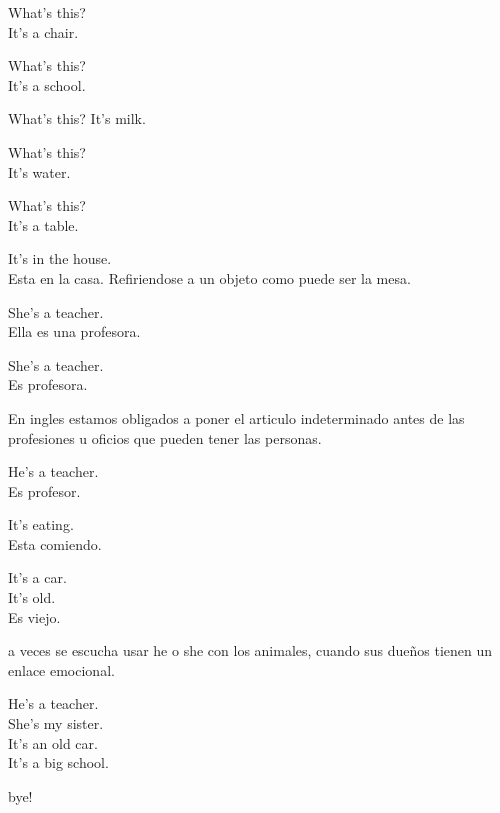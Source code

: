 What's this?\\
It's a chair.

What's this?\\
It's a school.

What's this?
It's milk.

What's this?\\
It's water.

What's this?\\
It's a table.

It's in the house.\\
Esta en la casa. Refiriendose a un objeto como puede ser la mesa.

She's a teacher.\\
Ella es una profesora.

She's a teacher.\\
Es profesora.

En ingles estamos obligados a poner el articulo indeterminado antes de
las profesiones u oficios que pueden tener las personas.

He's a teacher.\\
Es profesor.

It's eating.\\
Esta comiendo.

It's a car.\\

It's old.\\
Es viejo.

a veces se escucha usar he o she con los animales, cuando sus dueños tienen
un enlace emocional.

He's a teacher.\\
She's my sister.\\
It's an old car.\\
It's a big school.

bye!

